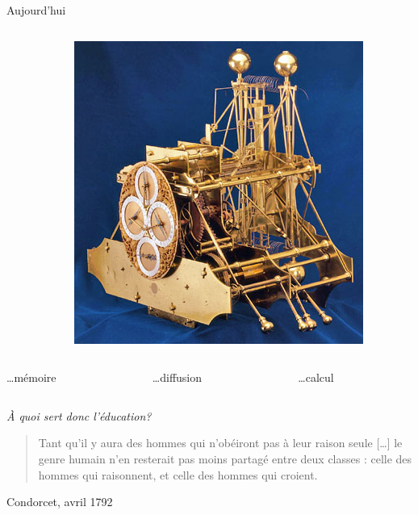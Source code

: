 \begin{frame}{Aujourd'hui}
\begin{columns}
\begin{column}{0.33\linewidth}
\end{column}
\begin{column}{0.33\linewidth}
\centering
\includegraphics[height=0.35\paperheight]{../resources/illustrations/harrison} \\
\end{column}
\end{columns}

\vfill

\begin{columns}
\begin{column}{0.33\linewidth}
\centering
\ldots mémoire
\end{column}
\begin{column}{0.33\linewidth}
\centering
\ldots diffusion
\end{column}
\begin{column}{0.33\linewidth}
\centering
\ldots calcul
\end{column}
\end{columns}
\end{frame}
\begin{frame}
\centering
\huge \emph{À quoi sert donc l'éducation?}
\vfill
\centering
\large
\begin{quote}
Tant qu'il y aura des hommes qui n'obéiront pas à leur raison seule [\ldots] le genre humain n'en resterait pas moins partagé entre deux classes : celle des hommes qui raisonnent, et celle 
des hommes qui croient.
\end{quote}
\vfill
\hfill Condorcet, avril 1792 
\end{frame}


